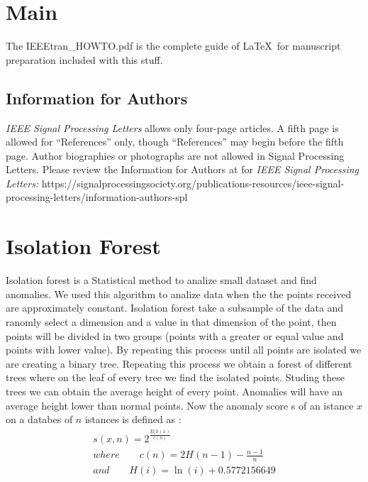\documentclass[journal]{IEEEtran}
\begin{document}
\IEEEpeerreviewmaketitle

\section{Main}


The IEEEtran\_HOWTO.pdf is the complete guide of \LaTeX\ for manuscript preparation included with this stuff. 


\subsection{Information for Authors}

{\em IEEE Signal Processing Letters} allows only four-page articles. A fifth page is allowed for ``References'' only, though ``References'' may begin before the fifth page. Author biographies or photographs are not allowed in Signal Processing Letters. Please review the Information for Authors at for {\em IEEE Signal Processing Letters:} https://signalprocessingsociety.org/publications-resources/ieee-signal-processing-letters/information-authors-spl

\section{Isolation Forest}

Isolation forest is a Statistical method to analize small dataset and find anomalies. We used this algorithm to analize data when the the points received are approximately constant. Isolation forest take  a subsample of the data and ranomly select a dimension and a value in that dimension of the point, then points will be divided in two groups (points with a greater or equal value and points with lower value). By repeating this process until all points are isolated we are creating a binary tree. Repeating this process we obtain a forest of different trees where on the leaf of every tree we find the isolated points. Studing these trees we can obtain the average height of every point. Anomalies will have an average height lower than normal points. 
Now the anomaly score s of an istance $x$ on a databes of $n$ istances is defined as :
\begin{gather}
s(x,n)=2^{\frac{E(h(x)}{c(n)}} \\
where \qquad c(n)=2H(n - 1) - \frac{n - 1}{n} \\
and \qquad H(i)=\ln (i) + 0.5772156649
\end{gather}
\end{document}
